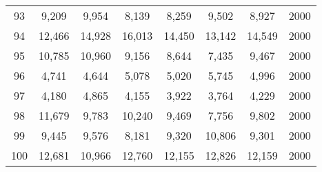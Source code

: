 \begin{longtable}{cccccccc}
93  & 9,209  & 9,954  & 8,139  & 8,259  & 9,502  & 8,927     & 2000 \\
94  & 12,466 & 14,928 & 16,013 & 14,450 & 13,142 & 14,549    & 2000 \\
95  & 10,785 & 10,960 & 9,156  & 8,644  & 7,435  & 9,467     & 2000 \\
96  & 4,741  & 4,644  & 5,078  & 5,020  & 5,745  & 4,996     & 2000 \\
97  & 4,180  & 4,865  & 4,155  & 3,922  & 3,764  & 4,229     & 2000 \\
98  & 11,679 & 9,783  & 10,240 & 9,469  & 7,756  & 9,802     & 2000 \\
99  & 9,445  & 9,576  & 8,181  & 9,320  & 10,806 & 9,301     & 2000 \\
100 & 12,681 & 10,966 & 12,760 & 12,155 & 12,826 & 12,159    & 2000 \\ \hline
\end{longtable}